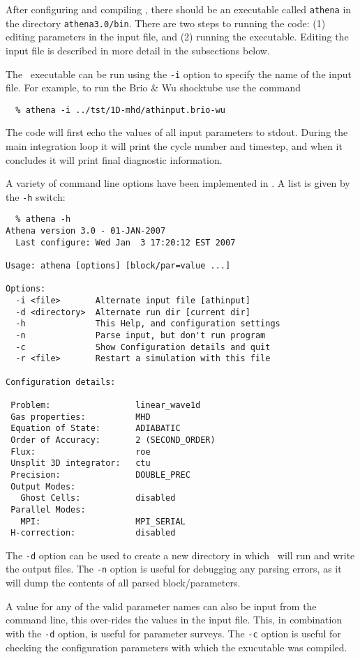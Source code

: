 After configuring and compiling \ath, there should be an executable
called {\tt athena} in the directory {\tt athena3.0/bin}.  There
are two steps to running the code: (1) editing parameters in the
input file, and (2) running the executable.  Editing the input file is 
described in more detail in the subsections below.

The \ath\ executable can be run using the {\tt -i} option to specify the name of
the input file.  For example, to run the Brio \& Wu shocktube use
the command
\begin{verbatim}
  % athena -i ../tst/1D-mhd/athinput.brio-wu
\end{verbatim}
The code will first echo the values of all input parameters to stdout.
During the main integration loop
it will print the cycle number and timestep, and
when it concludes it will print final diagnostic information.

A variety of command line options have been implemented in \ath.
A list is given by the {\tt -h} switch:
\begin{verbatim}
  % athena -h
Athena version 3.0 - 01-JAN-2007
  Last configure: Wed Jan  3 17:20:12 EST 2007

Usage: athena [options] [block/par=value ...]

Options:
  -i <file>       Alternate input file [athinput]
  -d <directory>  Alternate run dir [current dir]
  -h              This Help, and configuration settings
  -n              Parse input, but don't run program
  -c              Show Configuration details and quit
  -r <file>       Restart a simulation with this file

Configuration details:

 Problem:                 linear_wave1d
 Gas properties:          MHD
 Equation of State:       ADIABATIC
 Order of Accuracy:       2 (SECOND_ORDER)
 Flux:                    roe
 Unsplit 3D integrator:   ctu
 Precision:               DOUBLE_PREC
 Output Modes:
   Ghost Cells:           disabled
 Parallel Modes:
   MPI:                   MPI_SERIAL
 H-correction:            disabled
\end{verbatim}
The {\tt -d} option can be used to create a new directory in which
\ath\ will run and write the output files.  The {\tt -n} option is
useful for debugging any parsing errors, as it will dump the contents
of all parsed block/parameters.

A value for any of the valid parameter names can also be input from
the command line, this over-rides the values in the input file.
This, in combination with the {\tt -d} option, is
useful for parameter surveys.  The {\tt -c} option is useful for checking
the configuration parameters with which the exucutable was compiled.

